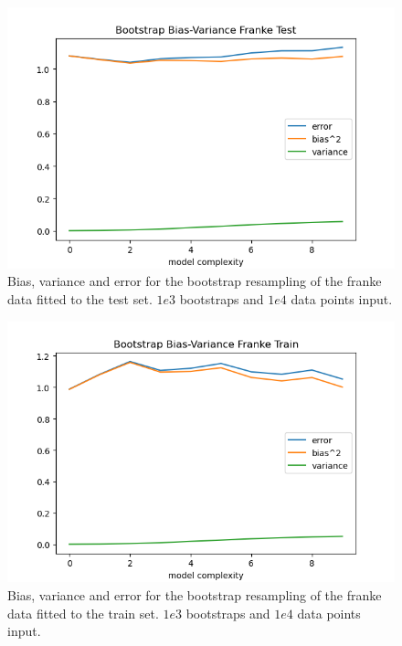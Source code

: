 \documentclass[12pt]{revtex4-2}
\begin{document}
\begin{figure}[hbtp]
\includegraphics[scale=0.7]{
	../plots/frankeBootstrapBiasVariancesigma1poly10boot1e3datapt1e4test.png}
\caption{
	Bias, variance and error for the bootstrap resampling of the franke data fitted to 
	the test set. $1e3$ bootstraps and $1e4$ data points input. 
	}
\label{fig:BootstrapBiasVariance1e4test}
\end{figure}

\begin{figure}[hbtp]
\includegraphics[scale=0.7]{
	../plots/frankeBootstrapBiasVariancesigma1poly10boot1e3datapt1e4train.png}
\caption{
	Bias, variance and error for the bootstrap resampling of the franke data fitted to 
	the train set. $1e3$ bootstraps and $1e4$ data points input. 
	}
\label{fig:BootstrapBiasVariance1e4train}
\end{figure}
\end{document}
